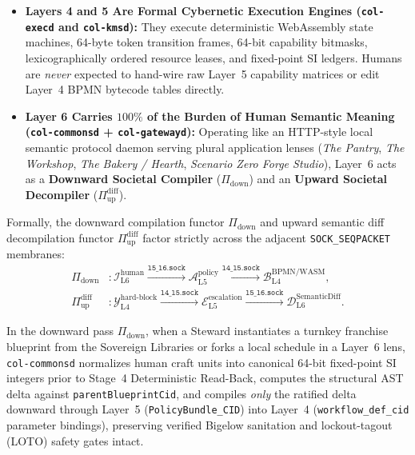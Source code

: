 \begin{itemize}
\item \textbf{Layers 4 and 5 Are Formal Cybernetic Execution Engines (\texttt{col-execd} and \texttt{col-kmsd}):}
        They execute deterministic WebAssembly state machines, 64-byte token transition frames,
        64-bit capability bitmasks, lexicographically ordered resource leases, and fixed-point SI
        ledgers. Humans are \textit{never} expected to hand-wire raw Layer~5 capability matrices
        or edit Layer~4 BPMN bytecode tables directly.
\item \textbf{Layer 6 Carries $100\%$ of the Burden of Human Semantic Meaning (\texttt{col-commonsd} + \texttt{col-gatewayd}):}
        Operating like an HTTP-style local semantic protocol daemon serving plural application
        lenses (\textit{The Pantry}, \textit{The Workshop}, \textit{The Bakery / Hearth},
        \textit{Scenario Zero Forge Studio}), Layer~6 acts as a \textbf{Downward Societal
        Compiler} ($\Pi_{\mathrm{down}}$) and an \textbf{Upward Societal Decompiler}
        ($\Pi_{\mathrm{up}}^{\mathrm{diff}}$).
\end{itemize}

Formally, the downward compilation functor $\Pi_{\mathrm{down}}$ and upward semantic diff
decompilation functor $\Pi_{\mathrm{up}}^{\mathrm{diff}}$ factor strictly across the adjacent
\texttt{SOCK\_SEQPACKET} membranes:
\begin{align}
\Pi_{\mathrm{down}} &: \mathcal{I}_{\mathrm{L6}}^{\mathrm{human}} \xrightarrow{\texttt{l5\_l6.sock}} \mathcal{A}_{\mathrm{L5}}^{\mathrm{policy}} \xrightarrow{\texttt{l4\_l5.sock}} \mathcal{B}_{\mathrm{L4}}^{\mathrm{BPMN/WASM}}, \label{eq:ch1-pi-down} \\
\Pi_{\mathrm{up}}^{\mathrm{diff}} &: \mathcal{Y}_{\mathrm{L4}}^{\mathrm{hard\text{-}block}} \xrightarrow{\texttt{l4\_l5.sock}} \mathcal{E}_{\mathrm{L5}}^{\mathrm{escalation}} \xrightarrow{\texttt{l5\_l6.sock}} \mathcal{D}_{\mathrm{L6}}^{\mathrm{SemanticDiff}}. \label{eq:ch1-pi-up}
\end{align}

In the downward pass $\Pi_{\mathrm{down}}$, when a Steward instantiates a turnkey franchise
blueprint from the Sovereign Libraries or forks a local schedule in a Layer~6 lens,
\texttt{col-commonsd} normalizes human craft units into canonical 64-bit fixed-point SI
integers prior to Stage~4 Deterministic Read-Back, computes the structural AST delta against
\texttt{parentBlueprintCid}, and compiles \textit{only} the ratified delta downward through
Layer~5 (\texttt{PolicyBundle\_CID}) into Layer~4 (\texttt{workflow\_def\_cid} parameter
bindings), preserving verified Bigelow sanitation and lockout-tagout (LOTO) safety gates
intact.

